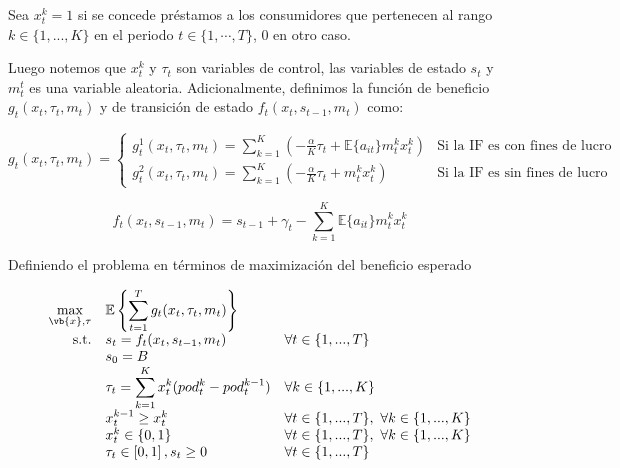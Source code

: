Sea $x_{t}^{k} = 1$ si se concede préstamos a los consumidores que pertenecen al rango $k \in \{1,...,K\}$ en el periodo $t \in \{1,\cdots,T\}$, 0 en otro caso. 

Luego notemos que $x_{t}^{k}$ y $\tau_t$ son variables de control, las variables de estado $s_t$ y $m_{t}^{t}$ es una variable aleatoria. Adicionalmente, definimos la función de beneficio $g_t(x_t,\tau_t, m_t)$ y de transición de estado $f_t(x_t, s_{t-1},m_{t})$ como:


\[ g_t(x_t,\tau_t, m_t)  = \begin{cases} g_t^1(x_t,\tau_t,m_t) = \sum_{k=1}^{K}\left(- \frac{\alpha}{K}\tau_t +  \mathbb{E}\{a_{it}\} m_{t}^{k} x_{t}^{k}\right) & \text{Si la IF es con fines de lucro} \\ g_t^2(x_t,\tau_t, m_t) = \sum_{k=1}^{K}\left(- \frac{\alpha}{K}\tau_t +  m_{t}^{k} x_{t}^{k}\right) & \text{Si la IF es sin fines de lucro} \end{cases} \] 
 
$$f_t(x_t,s_{t-1},m_t)= s_{t-1} + \gamma_t - \displaystyle\sum_{k=1}^{K}\mathbb{E}\{a_{it}\} m_{t}^{k} x_{t}^{k}$$

Definiendo el problema en términos de maximización del beneficio esperado

$$ \begin{array}{r l l}
	\displaystyle\max_{\vb{x}, \tau} & \mathbb{E} \left\lbrace \displaystyle\sum_{t=1}^{T} g_t(x_t,\tau_t, m_t) \right\rbrace &   									\\
	\text{s.t.}&  s_{t} = f_t(x_t,s_{t-1},m_t)	& \forall t \in \{1,...,T\}		\\
					&  s_{0} = B &                                                                                   	\\
					& \tau_{t} = \displaystyle\sum_{k=1}^{K} x_{t}^{k}({pod_{t}^k - pod_{t}^{k-1}}) & \forall k \in \{1,...,K\}                 \\
					
					& x_{t}^{k-1} \geq x_{t}^{k} & \forall t \in \{1,...,T\}  , \text{  } \forall k \in \{1,...,K\} \\
					
					& x_{t}^k \in \{0, 1\} & \forall t \in \{1,...,T\}  , \text{  } \forall k \in \{1,...,K\} \\                                      
					& \tau_{t} \in \left[0,1 \right] , s_{t} \geq 0 & \forall t \in \{1,...,T\}                \\
					
\end{array} $$




